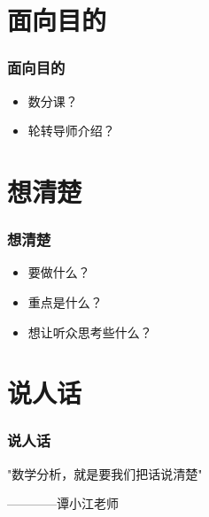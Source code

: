 \documentclass[AutoFakeBold]{beamer}
\begin{document}
{\begin{frame}
    \end{frame}

    \section{面向目的}

    \begin{frame}
        \frametitle{面向目的}
    
        \begin{itemize}
            \item 数分课？
            \item 轮转导师介绍？
        \end{itemize}
    
    \end{frame}

    \section{想清楚}

    \begin{frame}
        \frametitle{想清楚}
    
        \begin{itemize}
            \item 要做什么？
            \item 重点是什么？
            \item 想让听众思考些什么？
        \end{itemize}
    
    \end{frame}

    \section{说人话}

    \begin{frame}
        \frametitle{说人话}
    
        \begin{center}
            "数学分析，就是要我们把话说清楚"

                            ————谭小江老师
        \end{center}
    
    \end{frame}
    
}
\end{document}
